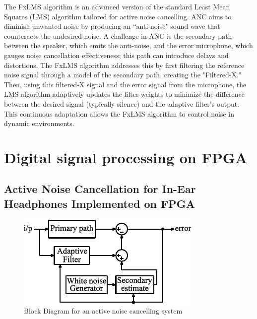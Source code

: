 The FxLMS algorithm is an advanced version of the standard Least Mean Squares (LMS) algorithm tailored for active noise cancelling. ANC aims to diminish unwanted noise by producing an ``anti-noise" sound wave that counteracts the undesired noise. A challenge in ANC is the secondary path between the speaker, which emits the anti-noise, and the error microphone, which gauges noise cancellation effectiveness; this path can introduce delays and distortions. The FxLMS algorithm addresses this \cite{ANC_Headphone_11} by first filtering the reference noise signal through a model of the secondary path, creating the "Filtered-X." Then, using this filtered-X signal and the error signal from the microphone, the LMS algorithm adaptively updates the filter weights to minimize the difference between the desired signal (typically silence) and the adaptive filter's output. This continuous adaptation allows the FxLMS algorithm to control noise in dynamic environments.

\section{Digital signal processing on FPGA}

\subsection{Active Noise Cancellation for In-Ear Headphones Implemented on FPGA}

\begin{figure}[h]
\centerline{\includegraphics[width=0.6\linewidth]{3-literature/ANCHeadphoneFPGA.pdf}}
\caption{Block Diagram for an active noise cancelling system}
\label{fig_ANCHeadphoneFPGA}
\end{figure}

